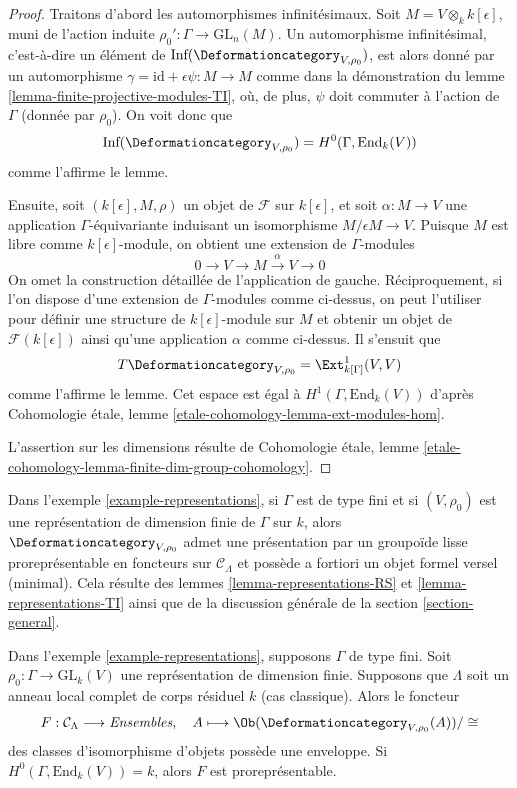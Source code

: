 \begin{proof}
Traitons d'abord les automorphismes infinitésimaux.
Soit $M = V \otimes_k k[\epsilon]$, muni de l'action induite
$\rho_0' : \Gamma \to \text{GL}_n(M)$.
Un automorphisme infinitésimal, c'est-à-dire un élément de
$\text{Inf}(\Deformationcategory_{V, \rho_0})$,
est alors donné par un automorphisme
$\gamma = \text{id} + \epsilon \psi : M \to M$
comme dans la démonstration du lemme \ref{lemma-finite-projective-modules-TI},
où, de plus, $\psi$ doit commuter
à l'action de $\Gamma$ (donnée par $\rho_0$).
On voit donc que
$$
\text{Inf}(\Deformationcategory_{V, \rho_0}) = H^0(\Gamma, \text{End}_k(V))
$$
comme l'affirme le lemme.

\medskip\noindent
Ensuite, soit $(k[\epsilon], M, \rho)$ un objet de $\mathcal{F}$
sur $k[\epsilon]$, et soit $\alpha : M \to V$ une application $\Gamma$-équivariante
induisant un isomorphisme $M/\epsilon M \to V$.
Puisque $M$ est libre comme $k[\epsilon]$-module, on obtient
une extension de $\Gamma$-modules
$$
0 \to V \to M \xrightarrow{\alpha} V \to 0
$$
On omet la construction détaillée de l'application de gauche.
Réciproquement, si l'on dispose d'une extension de $\Gamma$-modules comme
ci-dessus, on peut l'utiliser pour définir une structure de $k[\epsilon]$-module
sur $M$ et obtenir un objet de $\mathcal{F}(k[\epsilon])$
ainsi qu'une application $\alpha$ comme ci-dessus.
Il s'ensuit que
$$
T\Deformationcategory_{V, \rho_0} = \Ext^1_{k[\Gamma]}(V, V)
$$
comme l'affirme le lemme. Cet espace est égal à
$H^1(\Gamma, \text{End}_k(V))$ d'après Cohomologie étale,
lemme \ref{etale-cohomology-lemma-ext-modules-hom}.

\medskip\noindent
L'assertion sur les dimensions résulte de Cohomologie étale,
lemme
\ref{etale-cohomology-lemma-finite-dim-group-cohomology}.
\end{proof}

\noindent
Dans l'exemple \ref{example-representations}, si $\Gamma$ est de type fini
et si $(V, \rho_0)$ est une représentation de dimension finie de $\Gamma$
sur $k$, alors $\Deformationcategory_{V, \rho_0}$
admet une présentation par un groupoïde lisse proreprésentable en foncteurs
sur $\mathcal{C}_\Lambda$
et possède a fortiori un objet formel versel (minimal). Cela résulte
des lemmes \ref{lemma-representations-RS} et \ref{lemma-representations-TI}
ainsi que de la discussion générale de la section \ref{section-general}.

\begin{lemma}
\label{lemma-representations-hull}
Dans l'exemple \ref{example-representations}, supposons $\Gamma$ de type fini.
Soit $\rho_0 : \Gamma \to \text{GL}_k(V)$ une représentation de dimension finie.
Supposons que $\Lambda$ soit un anneau local complet de corps résiduel $k$
(cas classique). Alors le foncteur
$$
F : \mathcal{C}_\Lambda \longrightarrow \textit{Ensembles},\quad
A \longmapsto \Ob(\Deformationcategory_{V, \rho_0}(A))/\cong
$$
des classes d'isomorphisme d'objets possède une enveloppe. Si
$H^0(\Gamma, \text{End}_k(V)) = k$, alors $F$ est
proreprésentable.
\end{lemma}

